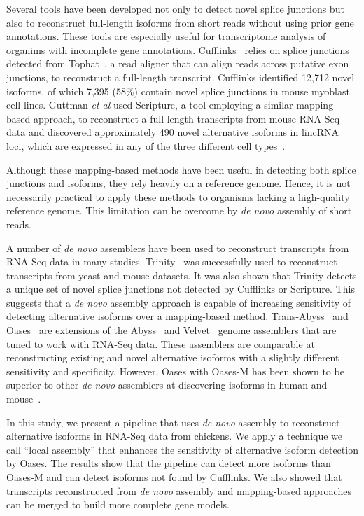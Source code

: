 Several tools have been developed not only to detect novel splice
junctions but also to reconstruct full-length isoforms from short
reads without using prior gene annotations.  These tools are especially
useful for transcriptome analysis of organims with incomplete gene
annotations.  Cufflinks~\cite{Trapnell:2010kd} relies on splice
junctions detected from Tophat~\cite{Trapnell:2009dp}, a read aligner
that can align reads across putative exon junctions, to reconstruct a
full-length transcript.  Cufflinks identified 12,712 novel isoforms,
of which 7,395 ($58\%$) contain novel splice junctions in mouse
myoblast cell lines.  Guttman {\em et al} used Scripture, a tool
employing a similar mapping-based approach, to reconstruct a full-length
transcripts from mouse RNA-Seq data and discovered approximately 490
novel alternative isoforms in lincRNA loci, which are expressed in any
of the three different cell types~\cite{Guttman:2010io}.

Although these mapping-based methods have been useful in detecting
both splice junctions and isoforms, they rely heavily on a reference
genome.  Hence, it is not necessarily practical to apply these methods
to organisms lacking a high-quality reference genome.  This limitation
can be overcome by {\em de novo} assembly of short reads.

A number of {\em de novo} assemblers have been used to reconstruct
transcripts from RNA-Seq data in many studies.
Trinity~\cite{Grabherr:2011jb} was successfully used to reconstruct
transcripts from yeast and mouse datasets.  It was also shown that
Trinity detects a unique set of novel splice junctions not detected by
Cufflinks or Scripture.  This suggests that a {\em de novo} assembly
approach is capable of increasing sensitivity of detecting
alternative isoforms over a mapping-based method.
Trans-Abyss~\cite{Robertson:2010ih} and Oases~\cite{Schulz:2012je} are
extensions of the Abyss~\cite{Simpson:2009iv} and
Velvet~\cite{Zerbino:2008vu,Zerbino:2009jp} genome assemblers that are
tuned to work with RNA-Seq data.  These assemblers are comparable at
reconstructing existing and novel alternative isoforms with a slightly
different sensitivity and specificity.  However, Oases with Oases-M
has been shown to be superior to other {\em de novo} assemblers at
discovering isoforms in human and mouse~\cite{Schulz:2012je}.

In this study, we present a pipeline that uses {\em de novo} assembly
to reconstruct alternative isoforms in RNA-Seq data from chickens.  We
apply a technique we call ``local assembly'' that enhances the sensitivity
of alternative isoform detection by Oases.  The results show that the
pipeline can detect more isoforms than Oases-M and can detect isoforms
not found by Cufflinks.  We also showed that transcripts reconstructed
from {\em de novo} assembly and mapping-based approaches can be merged
to build more complete gene models.

